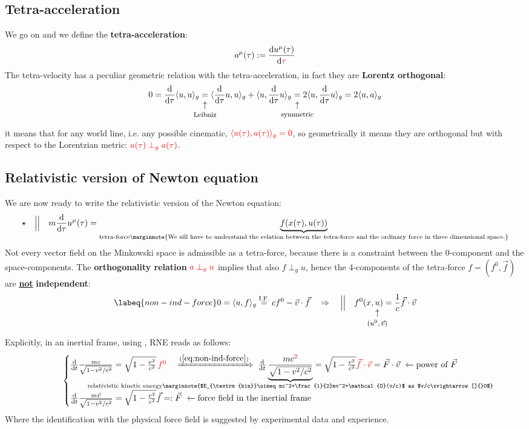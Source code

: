 \documentclass[../main.tex]{subfiles}
\begin{document}
\subsection{Tetra-acceleration}
We go on and we define the \textbf{tetra-acceleration}:
\[
a^{\mu}(\tau):=\dv{u^{\mu}(\tau)}{\color{red}\tau}
\]
The tetra-velocity has a peculiar geometric relation with the tetra-acceleration, in fact they are \textbf{Lorentz orthogonal}:
\[
0=\dv{\tau}\langle u,u \rangle_g\underset{\mathclap{\tikz \node {$\uparrow$} node [below=1ex] {\footnotesize Leibniz };}}=\langle\dv{\tau}u,u\rangle_g+\langle u,\dv{\tau}u\rangle_g\underset{\mathclap{\tikz \node {$\uparrow$} node [below=1ex] {\footnotesize symmetric};}}=2\langle u,\dv{\tau}u\rangle_g=2\langle u,a \rangle_g
\]
it means that for any world line, i.e. any possible cinematic, ${\color{red}\langle u(\tau),a(\tau) \rangle_g=0}$, so geometrically it means they are orthogonal but with respect to the Lorentzian metric: ${\color{red}u(\tau)\perp_g a(\tau)}$.
\subsection{Relativistic version of Newton equation}
We are now ready to write the relativistic version of the Newton equation:
\[
\star \quad \Big|\Big| \quad m\dv{\tau}u^{\mu}(\tau)=\underbrace{f(x(\tau),u(\tau))}_{\textrm{tetra-force\marginnote{We sill have to understand the relation between the tetra-force and the ordinary force in three dimensional space.}}}
\]
Not every vector field on the Minkowski space is admissible as a tetra-force, because there is a constraint between the 0-component and the space-components.
The \textbf{orthogonality relation} ${\color{red}a\perp_g u}$ implies that also $f\perp_g u$, hence the 4-components of the tetra-force $f=(f^0,\vec{f})$ are \underline{\textbf{not}} \textbf{independent}:
\begin{equation}\labeq{non-ind-force}
0=\langle u,f \rangle_g\overset{\textrm{I.F.}}{=}cf^0-\vec{v}\cdot\vec{f}\quad \Rightarrow \quad \Big|\Big| \quad f^0(x,\underset{\mathclap{\tikz \node {$\uparrow$} node [below=1ex] {\footnotesize $(u^0,\vec{v})$};}}u)=\frac{1}{c}\vec{f}\cdot\vec{v}
\end{equation}
Explicitly, in an inertial frame, using , RNE reads as follows:
\[
\begin{cases}
\dv{t}\frac{mc}{\sqrt{1-v^2/c^2}}=\sqrt{1-\frac{v^2}{c^2}}\,{\color{red}f^0}\quad \xRightarrow[]{(\ref{eq:non-ind-force})}\; \dv{t}\underbrace{\frac{mc^{\color{red}2}}{\sqrt{1-v^2/c^2}}}_{\mathclap{\text{relativistic kinetic energy\marginnote{$E_{\textrm{kin}}\simeq mc^2+\frac{1}{2}mv^2+\mathcal{O}(v/c)$ as $v/c\xrightarrow[]{}0$}}}}=\sqrt{1-\frac{v^2}{c^2}}{\color{red}\vec{f}\cdot\vec{v}}=\vec{F}\cdot\vec{v}\ \xleftarrow[]{}\text{power of $\vec{F}$} \\
\dv{t}\frac{m\vec{v}}{\sqrt{1-v^2/c^2}}=\sqrt{1-\frac{v^2}{c^2}}\vec{f}=:\vec{F}\ \xleftarrow[]{}\text{force field in the inertial frame}
\end{cases}
\]
Where the identification with the physical force field is suggested by experimental data and experience.
\end{document}
